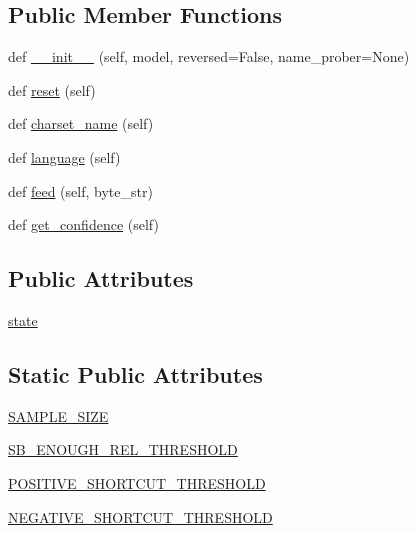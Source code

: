 \subsection*{Public Member Functions}
\begin{DoxyCompactItemize}
\item 
def \hyperlink{classpip_1_1__vendor_1_1chardet_1_1sbcharsetprober_1_1SingleByteCharSetProber_a233be0c60fe52112ccc1877339405ffc}{\+\_\+\+\_\+init\+\_\+\+\_\+} (self, model, reversed=False, name\+\_\+prober=None)
\item 
def \hyperlink{classpip_1_1__vendor_1_1chardet_1_1sbcharsetprober_1_1SingleByteCharSetProber_a5fdca398c777f973566899bc4475f199}{reset} (self)
\item 
def \hyperlink{classpip_1_1__vendor_1_1chardet_1_1sbcharsetprober_1_1SingleByteCharSetProber_abe59d86021a8239d2cadad8659ca4a2b}{charset\+\_\+name} (self)
\item 
def \hyperlink{classpip_1_1__vendor_1_1chardet_1_1sbcharsetprober_1_1SingleByteCharSetProber_ad86bfea350cea90d3e0d3c9aeb5a5834}{language} (self)
\item 
def \hyperlink{classpip_1_1__vendor_1_1chardet_1_1sbcharsetprober_1_1SingleByteCharSetProber_a34084783a02f898b7283b01c70c46f91}{feed} (self, byte\+\_\+str)
\item 
def \hyperlink{classpip_1_1__vendor_1_1chardet_1_1sbcharsetprober_1_1SingleByteCharSetProber_ad23df6786b6fdac6340ee729e7fedd22}{get\+\_\+confidence} (self)
\end{DoxyCompactItemize}
\subsection*{Public Attributes}
\begin{DoxyCompactItemize}
\item 
\hyperlink{classpip_1_1__vendor_1_1chardet_1_1sbcharsetprober_1_1SingleByteCharSetProber_a40ec78b3ff3fba244f59ccdc64ed7cd2}{state}
\end{DoxyCompactItemize}
\subsection*{Static Public Attributes}
\begin{DoxyCompactItemize}
\item 
\hyperlink{classpip_1_1__vendor_1_1chardet_1_1sbcharsetprober_1_1SingleByteCharSetProber_a7441584c2901f3ad3c8140dd00070d3a}{S\+A\+M\+P\+L\+E\+\_\+\+S\+I\+ZE}
\item 
\hyperlink{classpip_1_1__vendor_1_1chardet_1_1sbcharsetprober_1_1SingleByteCharSetProber_a79b798f4b05234989d98e5d85ed07a7b}{S\+B\+\_\+\+E\+N\+O\+U\+G\+H\+\_\+\+R\+E\+L\+\_\+\+T\+H\+R\+E\+S\+H\+O\+LD}
\item 
\hyperlink{classpip_1_1__vendor_1_1chardet_1_1sbcharsetprober_1_1SingleByteCharSetProber_ab4789d9b6336dda58ad7472bef32e6ee}{P\+O\+S\+I\+T\+I\+V\+E\+\_\+\+S\+H\+O\+R\+T\+C\+U\+T\+\_\+\+T\+H\+R\+E\+S\+H\+O\+LD}
\item 
\hyperlink{classpip_1_1__vendor_1_1chardet_1_1sbcharsetprober_1_1SingleByteCharSetProber_a0500ac6884cdc00fa87a50bf36a7ef2b}{N\+E\+G\+A\+T\+I\+V\+E\+\_\+\+S\+H\+O\+R\+T\+C\+U\+T\+\_\+\+T\+H\+R\+E\+S\+H\+O\+LD}
\end{DoxyCompactItemize}
